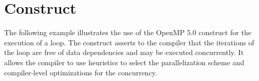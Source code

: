 \pagebreak
\section{ Construct}
\label{sec:loop}

The following example illustrates the use of the OpenMP 5.0 
construct for the execution of a loop.
The  construct asserts to the compiler that the iterations 
of the loop are free of data dependencies and may be executed concurrently.
It allows the compiler to use heuristics to select the parallelization scheme
and compiler-level optimizations for the concurrency. 


